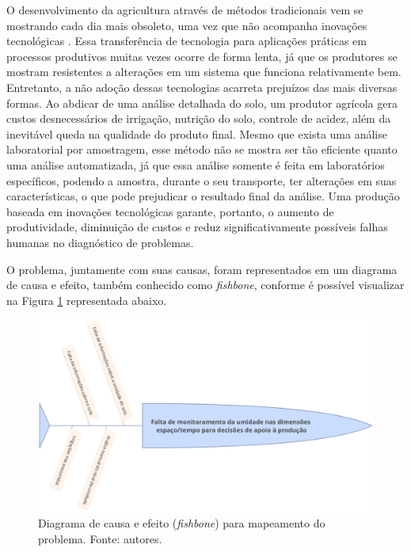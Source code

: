   O desenvolvimento da agricultura através de métodos tradicionais vem se
  mostrando cada dia mais obsoleto, uma vez que não acompanha inovações
  tecnológicas \cite{ROCHA2015}. Essa transferência de tecnologia para aplicações
  práticas em processos produtivos muitas vezes ocorre de forma lenta, já que
  os produtores se mostram resistentes a alterações em um sistema que funciona
  relativamente bem. Entretanto, a não adoção dessas tecnologias acarreta
  prejuízos das mais diversas formas. Ao abdicar de uma análise detalhada do
  solo, um produtor agrícola gera custos desnecessários de irrigação, nutrição
  do solo, controle de acidez, além da inevitável queda na qualidade do produto
  final. Mesmo que exista uma análise laboratorial por amostragem, esse método
  não se mostra ser tão eficiente quanto uma análise automatizada, já que essa
  análise somente é feita em laboratórios específicos, podendo a amostra,
  durante o seu transporte, ter alterações em suas características, o que pode
  prejudicar o resultado final da análise. Uma produção baseada em inovações
  tecnológicas garante, portanto, o aumento de produtividade, diminuição de
  custos e reduz significativamente possíveis falhas humanas no diagnóstico de
  problemas.


  O problema, juntamente com suas causas, foram representados em um diagrama
  de causa e efeito, também conhecido como \textit{fishbone}, conforme é possível visualizar
  na Figura \ref{fig01} representada abaixo.

  \begin{figure}[h]
    \centering
    \includegraphics[keepaspectratio=true,scale=0.5]{figuras/fig01.eps}
    \caption{Diagrama de causa e efeito (\textit{fishbone}) para mapeamento do problema. Fonte: autores.}
    \label{fig01}
  \end{figure}

